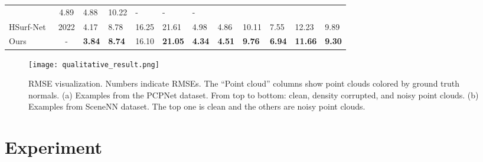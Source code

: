 \documentclass[sigconf]{acmart}
\begin{document}
\begin{table*}[t]
\begin{tabular}{@{}l|c|lllllll|lll@{}}
        &         4.89
        & \multicolumn{1}{l|}{4.88}         
        &                         10.22                      
        &                              -              
        & \multicolumn{1}{l|}{-}                       
        &                      -                        
        \\
        HSurf-Net~\cite{li2022hsurf}
        & 2022
        &  4.17    
        &      8.78  
        &       16.25
        & \multicolumn{1}{l|}{21.61}      
        &         4.98
        & \multicolumn{1}{l|}{4.86}         
        &                         10.11                      
        &                              7.55              
        & \multicolumn{1}{l|}{12.23}                       
        &                          9.89                    
        \\
        \midrule
        Ours 
        & -
        & \textbf{3.84}
        &     \textbf{8.74}   
        &       16.10
        & \multicolumn{1}{l|}{\textbf{21.05}}      
        &         \textbf{4.34}
        & \multicolumn{1}{l|}{\textbf{4.51}}         
        &                         \textbf{9.76}                      
        &                             \textbf{6.94}               
        & \multicolumn{1}{l|}{\textbf{11.66}}                       
        &                          \textbf{9.30}                    
        \\
        \bottomrule
        
    \end{tabular}
    \label{tab: pcpnet result}
\end{table*} 
\begin{figure*}[t]
  \centering
  \texttt{[image: qualitative\_result.png]}
  \caption{RMSE visualization. Numbers indicate RMSEs. The ``Point cloud'' columns show point clouds colored by ground truth normals. (a) Examples from the PCPNet dataset. From top to bottom: clean, density corrupted, and noisy point clouds. (b) Examples from SceneNN dataset. The top one is clean and the others are noisy point clouds.}
  \label{fig: error visualizations}
\end{figure*}





\section{Experiment}
\end{document}
